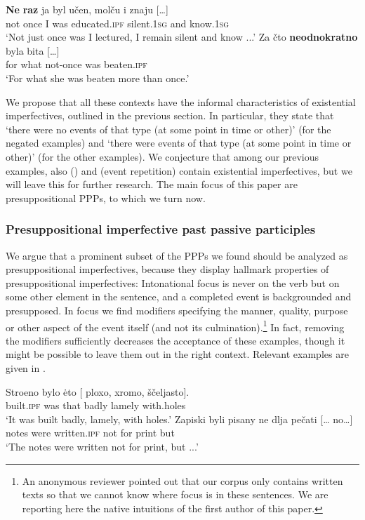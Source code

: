 \documentclass[output=paper,modfonts,newtxmath,hidelinks
\ChapterDOI{10.5281/zenodo.2545513}
]{langscibook}
\begin{document}
\ea\label{neraz}
\ea\gll	\textbf{Ne} \textbf{raz} ja byl učen, molču i znaju [\dots]\\ 
	not once I was educated.\textsc{ipf} silent.\textsc{1sg} and know.\textsc{1sg}\\
\glt	`Not just once was I lectured, I remain silent and know ...'
\ex\gll	Za čto \textbf{neodnokratno} byla bita [\dots]\\
	for what not-once was beaten.\textsc{ipf}\\
\glt	`For what she was beaten more than once.'
\z\z
	
\noindent We propose that all these contexts have the informal characteristics of existential imperfectives, outlined in the previous section. In particular, they state that `there were no events of that type (at some point in time or other)' (for the negated examples) and `there were events of that type (at some point in time or other)' (for the other examples). We conjecture that among our previous examples, also  () and  (event repetition) contain existential imperfectives, but we will leave this for further research. The main focus of this paper are presuppositional  PPPs, to which we turn now.

\subsubsection{Presuppositional imperfective past passive participles}

We argue that a prominent subset of the  PPPs we found should be analyzed as presuppositional imperfectives, because they display hallmark properties of presuppositional imperfectives: Intonational focus is never on the verb but on some other element in the sentence, and a completed event is backgrounded and presupposed. In focus we find modifiers specifying the manner, quality, purpose or other aspect of the event itself (and not its culmination).\footnote{An anonymous reviewer pointed out that our corpus only contains written texts so that we cannot know where focus is in these sentences. We are reporting here the native  intuitions of the first author of this paper.} In fact, removing the modifiers sufficiently decreases the acceptance of these examples, though it might be possible to leave them out in the right context. Relevant examples are given in .  

\ea\label{stroeno}
\ea\gll 	Stroeno bylo \.{e}to [\hspace{-2pt} ploxo, xromo, ščeljasto].\\
	built.\textsc{ipf} was that {} badly lamely with.holes\\
\glt	`It was built badly, lamely, with holes.' \label{stroenoa}
\ex\gll 	Zapiski byli pisany ne dlja pečati [{\dots} no\dots]\\	
	notes were written.\textsc{ipf} not for print {} but {}\\
\glt	`The notes were written not for print, but ...' \label{zapiski}
\z\z
\end{document}
